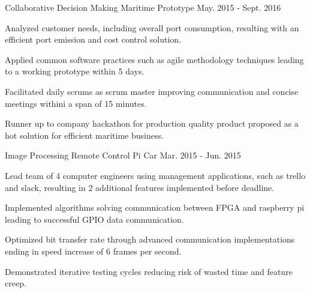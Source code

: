 

\begin{cventries}

  \cvtechentry
    {Collaborative Decision Making Maritime Prototype} %
    {} %
    {} %
    {May. 2015 - Sept. 2016} %
    {
      \begin{cvitems} %
        \item {Analyzed customer needs, including overall port consumption, resulting with an efficient port emission and cost control solution.}
        \item {Applied common software practices such as agile methodology techniques leading to a working prototype within 5 days.}
        \item {Facilitated daily scrums as scrum master improving communication and concise meetings withini a span of 15 minutes.}
        \item {Runner up to company hackathon for production quality product proposed as a hot solution for efficient maritime business.}
      \end{cvitems}
    }
    
  \cvtechentry
    {Image Processing Remote Control Pi Car} %
    {} %
    {} %
    {Mar. 2015 - Jun. 2015} %
    {
      \begin{cvitems} %
        \item {Lead team of 4 computer engineers using management applications, such as trello and slack, resulting in 2 additional features implemented before deadline.}
        \item {Implemented algorithms solving communication between FPGA and raspberry pi leading to successful GPIO data communication.}
        \item {Optimized bit transfer rate through advanced communication implementations ending in speed increase of 6 frames per second.}
        \item {Demonstrated iterative testing cycles reducing risk of wasted time and feature creep.}
      \end{cvitems}
    }
    

\end{cventries}
